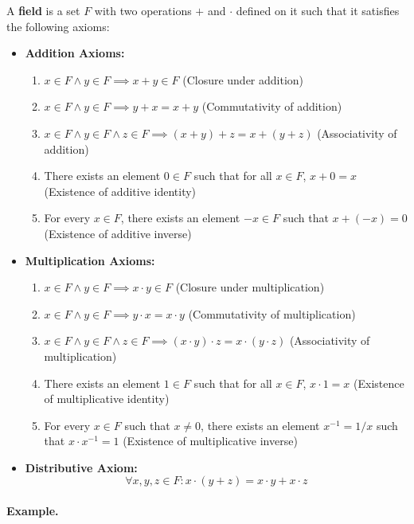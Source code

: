 \documentclass[openany]{book}
\numberwithin{equation}{section}
\begin{document}
    A \textbf{field} is a set $F$ with two operations $+$ and $\cdot$ defined on it such that it satisfies the following axioms: 
    \begin{itemize}
    \item \textbf{Addition Axioms:}
        \begin{enumerate}
            \item $x \in F \wedge y \in F \implies x + y \in F$ (Closure under addition)
            \item $x \in F \wedge y \in F \implies y + x = x + y$ (Commutativity of addition)
            \item $x \in F \wedge y \in F \wedge z \in F \implies (x + y) + z = x + (y + z)$ (Associativity of addition)
            \item There exists an element $0 \in F$ such that for all $x \in F$, $x + 0 = x$ (Existence of additive identity)
            \item For every $x \in F$, there exists an element $-x \in F$ such that $x + (-x) = 0$ (Existence of additive inverse)
        \end{enumerate}
    \item \textbf{Multiplication Axioms:}
        \begin{enumerate}
            \item $x \in F \wedge y \in F \implies x \cdot y \in F$ (Closure under multiplication)
            \item $x \in F \wedge y \in F \implies y \cdot x = x \cdot y$ (Commutativity of multiplication)
            \item $x \in F \wedge y \in F \wedge z \in F \implies (x \cdot y) \cdot z = x \cdot (y \cdot z)$ (Associativity of multiplication)
            \item There exists an element $1 \in F$ such that for all $x \in F$, $x \cdot 1 = x$ (Existence of multiplicative identity)
            \item For every $x \in F$ such that $x \neq 0$, there exists an element $x^{-1} = 1/x$ such that $x \cdot x^{-1} = 1$ (Existence of multiplicative inverse)
        \end{enumerate}
    \item \textbf{Distributive Axiom:} $$\forall x, y, z \in F: x \cdot (y + z) = x \cdot y + x \cdot z$$   
    \end{itemize}
    \paragraph{Example.}
\end{document}
